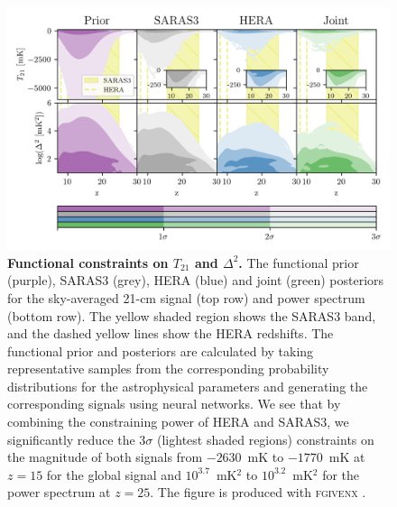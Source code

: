 \begin{figure}
    \centering
    \includegraphics{joint_constraints/figs/fgivenx_plots.png}
    \caption{\textbf{Functional constraints on $T_{21}$ and $\Delta^2$.} The functional prior (purple), SARAS3 (grey), HERA (blue) and joint (green) posteriors for the sky-averaged 21-cm signal (top row) and power spectrum (bottom row). The yellow shaded region shows the SARAS3 band, and the dashed yellow lines show the HERA redshifts. The functional prior and posteriors are calculated by taking representative samples from the corresponding probability distributions for the astrophysical parameters and generating the corresponding signals using neural networks. We see that by combining the constraining power of HERA and SARAS3, we significantly reduce the $3\sigma$ (lightest shaded regions) constraints on the magnitude of both signals from $-2630$~mK to $-1770$~mK at $z=15$ for the global signal and $10^{3.7}$~mK$^{2}$ to $10^{3.2}$~mK$^{2}$ for the power spectrum at $z=25$. The figure is produced with \textsc{fgivenx} \cite{fgivenx}.}
    \label{fig:functional}
\end{figure}


